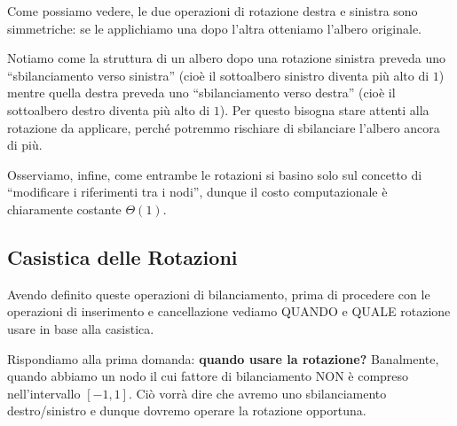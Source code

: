 \documentclass[12pt]{report}
\begin{document}
	Come possiamo vedere, le due operazioni di rotazione destra e sinistra sono simmetriche: se le applichiamo una dopo l'altra otteniamo l'albero originale.
	
	Notiamo come la struttura di un albero dopo una rotazione sinistra preveda uno ``sbilanciamento verso sinistra'' (cioè il sottoalbero sinistro diventa più alto di $1$) mentre quella destra preveda uno ``sbilanciamento verso destra'' (cioè il sottoalbero destro diventa più alto di $1$). Per questo bisogna stare attenti alla rotazione da applicare, perché potremmo rischiare di sbilanciare l'albero ancora di più.
	
	Osserviamo, infine, come entrambe le rotazioni si basino solo sul concetto di ``modificare i riferimenti tra i nodi'', dunque il costo computazionale è chiaramente costante $\Theta(1)$.
	
	\subsection{Casistica delle Rotazioni}
	Avendo definito queste operazioni di bilanciamento, prima di procedere con le operazioni di inserimento e cancellazione vediamo QUANDO e QUALE rotazione usare in base alla casistica.
	
	Rispondiamo alla prima domanda: \textbf{quando usare la rotazione?} Banalmente, quando abbiamo un nodo il cui fattore di bilanciamento NON è compreso nell'intervallo $[-1, 1]$. Ciò vorrà dire che avremo uno sbilanciamento destro/sinistro e dunque dovremo operare la rotazione opportuna.
	
\end{document}

